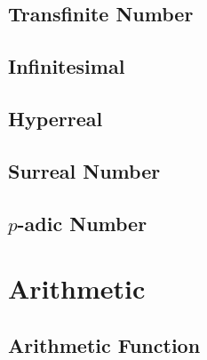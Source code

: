 \subsection{Transfinite Number}\label{sec:transfinite_number}

\subsection{Infinitesimal}\label{sec:infinitesimal}

\subsection{Hyperreal}\label{sec:hyperreal}

\subsection{Surreal Number}\label{sec:surreal_number}

\subsection{$p$-adic Number}\label{sec:padic_number}



\section{Arithmetic}\label{sec:arithmetic}

\subsection{Arithmetic Function}\label{sec:arithmetic_function}

